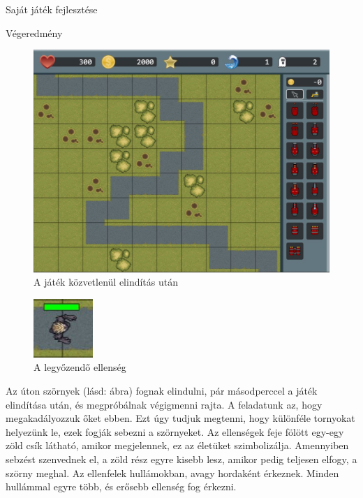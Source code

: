 \begin{MyChapter}{Saját játék fejlesztése}
\begin{MySection}{Végeredmény}
		\begin{figure}[h!]
			\centering
			\includegraphics[scale=0.57]{kepek/jatekHasznalat/game_scene}
			\caption{A játék közvetlenül elindítás után}
			\label{fig:jatekHasznalat:game_scene}
		\end{figure}
		
		\begin{figure}
			\begin{center}
				\includegraphics[width=0.2\textwidth]{kepek/jatekHasznalat/szorny}
			\end{center}
			\caption{A legyőzendő ellenség}
			\label{fig:jatekHasznalat:szorny}
		\end{figure}
		Az úton szörnyek (lásd:  ábra) fognak elindulni, pár másodperccel a játék elindítása után, és megpróbálnak végigmenni rajta.
		A feladatunk az, hogy megakadályozzuk őket ebben. Ezt úgy tudjuk megtenni, hogy különféle tornyokat helyezünk le, ezek fogják sebezni a szörnyeket.
		Az ellenségek feje fölött egy-egy zöld csík látható, amikor megjelennek, ez az életüket szimbolizálja. Amennyiben sebzést szenvednek el, a zöld rész egyre kisebb lesz, amikor pedig teljesen elfogy, a szörny meghal. Az ellenfelek hullámokban, avagy hordaként érkeznek. Minden hullámmal egyre több, és erősebb ellenség fog érkezni.
		

\end{MySection}
\end{MyChapter}
